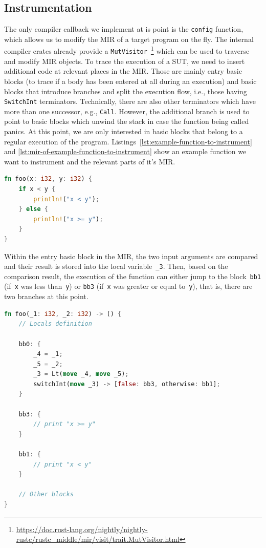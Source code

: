 \documentclass{article}
\begin{document}
\subsection{Instrumentation}
The only compiler callback we implement at is point is the \lstinline{config} function, which allows us to modify the \ac{MIR} of a target program on the fly. The internal compiler crates already provide a \lstinline{MutVisitor}~\footnote{\url{https://doc.rust-lang.org/nightly/nightly-rustc/rustc_middle/mir/visit/trait.MutVisitor.html}} which can be used to traverse and modify \ac{MIR} objects. To trace the execution of a \ac{SUT}, we need to insert additional code at relevant places in the \ac{MIR}. Those are mainly entry basic blocks (to trace if a body has been entered at all during an execution) and basic blocks that introduce branches and split the execution flow, i.e., those having \lstinline{SwitchInt} terminators. Technically, there are also other terminators which have more than one successor, e.g., \lstinline{Call}. However, the additional branch is used to point to basic blocks which unwind the stack in case the function being called panics. At this point, we are only interested in basic blocks that belong to a regular execution of the program. Listings~\ref{lst:example-function-to-instrument} and \ref{lst:mir-of-example-function-to-instrument} show an example function we want to instrument and the relevant parts of it's \ac{MIR}.

\begin{lstlisting}[language=Rust, style=boxed, caption={Example function to instrument}, label=lst:example-function-to-instrument]
fn foo(x: i32, y: i32) {
    if x < y {
        println!("x < y");
    } else {
        println!("x >= y");
    }
}
\end{lstlisting}

Within the entry basic block in the \ac{MIR}, the two input arguments are compared and their result is stored into the local variable~\lstinline{_3}. Then, based on the comparison result, the execution of the function can either jump to the block~\lstinline{bb1} (if~\lstinline{x} was less than~\lstinline{y}) or \lstinline{bb3} (if~\lstinline{x} was greater or equal to~\lstinline{y}), that is, there are two branches at this point.
\begin{lstlisting}[language=Rust, style=boxed, caption={MIR of the \lstinline{foo} function}, label=lst:mir-of-example-function-to-instrument]
fn foo(_1: i32, _2: i32) -> () {
    // Locals definition

    bb0: {
        _4 = _1;
        _5 = _2;
        _3 = Lt(move _4, move _5);
        switchInt(move _3) -> [false: bb3, otherwise: bb1];
    }

    bb3: {
        // print "x >= y"
    }

    bb1: {
        // print "x < y"
    }

    // Other blocks
}
\end{lstlisting}
\end{document}

